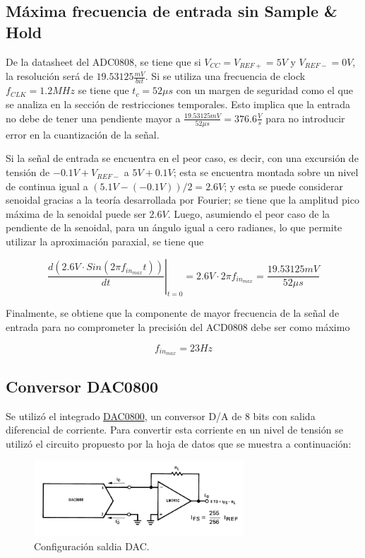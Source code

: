 \subsection{Máxima frecuencia de entrada sin Sample \& Hold}

De la datasheet del ADC0808, se tiene que si $V_{CC} = V_{REF+} = 5V$ y $V_{REF-} = 0V$, la resolución será de $19.53125 \frac{mV}{bit}$. Si se utiliza una frecuencia de clock $f_{CLK} = 1.2MHz$ se tiene que $t_{c} = 52\mu s$ con un margen de seguridad como el que se analiza en la sección de restricciones temporales. Esto implica que la entrada no debe de tener una pendiente mayor a $\frac{19.53125mV}{52\mu s} = 376.6\frac{V}{s}$ para no introducir error en la cuantización de la señal.

Si la señal de entrada se encuentra en el peor caso, es decir, con una excursión de tensión de $-0.1V + V_{REF-}$ a $5V + 0.1V$; esta se encuentra montada sobre un nivel de continua igual a $(5.1V - (-0.1V))/2 = 2.6V$; y esta se puede considerar senoidal gracias a la teoría desarrollada por Fourier; se tiene que la amplitud pico máxima de la senoidal puede ser $2.6V$. Luego, asumiendo el peor caso de la pendiente de la senoidal, para un ángulo igual a cero radianes, lo que permite utilizar la aproximación paraxial, se tiene que

\begin{equation}
\left. \frac{d \left( 2.6V \cdot Sin \left( 2\pi f_{in_{max}} t \right) \right)}{dt} \right|_{t=0} = 2.6V \cdot 2\pi f_{in_{max}} = \frac{19.53125mV}{52\mu s}
\end{equation}

Finalmente, se obtiene que la componente de mayor frecuencia de la señal de entrada para no comprometer la precisión del ACD0808 debe ser como máximo

$$f_{in_{max}} = 23Hz$$

\subsection{Conversor DAC0800}
Se utilizó el integrado \href{https://www.ti.com/lit/ds/symlink/dac0808.pdf?ts=1591879123116&ref_url=https://www.google.com/}{DAC0800}, un conversor D/A de 8 bits con salida diferencial de corriente.
Para convertir esta corriente en un nivel de tensión se utilizó el circuito propuesto por la hoja de datos que se muestra a continuación:
\begin{figure}[H]
	\centering
	\includegraphics[width=0.7\textwidth]{ImagenesEjercicio1/dacout.png}
\caption{Configuración saldia DAC.}
	\label{fig:dacout}
\end{figure}


